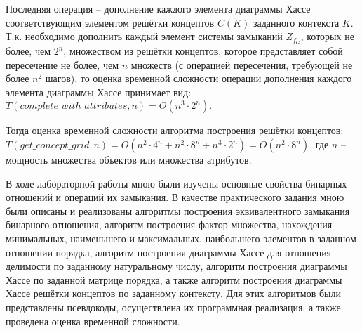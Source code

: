 \documentclass[spec, och, otchet, hidelinks]{SCWorks}
\begin{document}
\par Последняя операция -- дополнение каждого элемента диаграммы Хассе
соответствующим элементом решётки концептов $C(K)$ заданного контекста $K$. Т.к.
необходимо дополнить каждый элемент системы замыканий $Z_{f_G}$, которых не
более, чем $2^n$, множеством из решётки концептов, которое представляет собой
пересечение не более, чем $n$ множеств (с операцией пересечения, требующей не
более $n^2$ шагов), то оценка временной сложности операции дополнения каждого
элемента диаграммы Хассе принимает вид: $T(complete\_with\_attributes, n) = O(n^3
\cdot 2^n).$

\par Тогда оценка временной сложности алгоритма построения решётки концептов:
$T(get\_concept\_grid, n) = O(n^2 \cdot 4^n + n^2 \cdot 8^n + n^3 \cdot 2^n) =
O(n^2 \cdot 8^n)$, где $n$ -- мощность множества объектов или множества атрибутов.

\newpage

\conclusion

\par В ходе лабораторной работы мною были изучены основные свойства бинарных
отношений и операций их замыкания. В качестве практического задания мною были
описаны и реализованы алгоритмы построения эквивалентного замыкания бинарного
отношения, алгоритм построения фактор-множества, нахождения минимальных,
наименьшего и максимальных, наибольшего элементов в заданном отношении порядка,
алгоритм построения диаграммы Хассе для отношения делимости по заданному
натуральному числу, алгоритм построения диаграммы Хассе по заданной матрице
порядка, а также алгоритм построения диаграммы Хассе решётки концептов по заданному контексту.
Для этих алгоритмов были представлены псевдокоды, осуществлена их программная
реализация, а также проведена оценка временной сложности.
\end{document}
